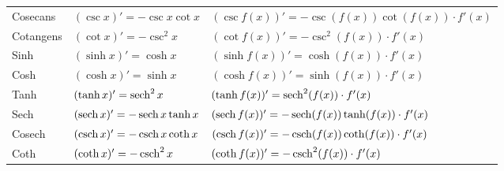 \begin{table}[H]
\begin{tabular}{@{}>{\raggedright}p{2.65cm}ll@{}}
Cosecans & $(\csc x)' = -\csc x \cot x$ & $(\csc f(x))' = -\csc(f(x)) \cot(f(x)) \cdot f'(x)$ \\
Cotangens & $(\cot x)' = -\csc^2 x$ & $(\cot f(x))' = -\csc^2(f(x)) \cdot f'(x)$ \\
\midrule
Sinh & $(\sinh x)' = \cosh x$ & $(\sinh f(x))' = \cosh(f(x)) \cdot f'(x)$ \\
Cosh & $(\cosh x)' = \sinh x$ & $(\cosh f(x))' = \sinh(f(x)) \cdot f'(x)$ \\
Tanh & $(\tanh x)' = \operatorname{sech}^2 x$ & $(\tanh f(x))' = \operatorname{sech}^2(f(x)) \cdot f'(x)$ \\
Sech & $(\operatorname{sech} x)' = -\operatorname{sech} x \tanh x$ & $(\operatorname{sech} f(x))' = -\operatorname{sech}(f(x)) \tanh(f(x)) \cdot f'(x)$ \\
Cosech & $(\operatorname{csch} x)' = -\operatorname{csch} x \coth x$ & $(\operatorname{csch} f(x))' = -\operatorname{csch}(f(x)) \coth(f(x)) \cdot f'(x)$ \\
Coth & $(\coth x)' = -\operatorname{csch}^2 x$ & $(\coth f(x))' = -\operatorname{csch}^2(f(x)) \cdot f'(x)$ \\
\bottomrule
\end{tabular}
\endgroup
\end{table}
